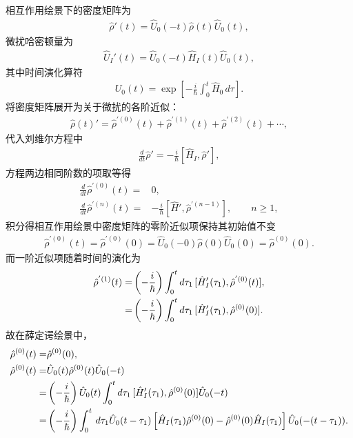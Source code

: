\documentclass[a4paper, 10pt]{article}
\begin{document}
\begin{multicols}{2}
相互作用绘景下的密度矩阵为
\begin{align}
    \hat{\rho}'(t)=\hat{U}_0(-t)\hat{\rho}(t)\hat{U}_0(t),
\end{align}
微扰哈密顿量为
\begin{align}
    \hat{U}_I'(t)=\hat{U}_0(-t)\hat{H}_I(t)\hat{U}_0(t),
\end{align}
其中时间演化算符
\begin{align}
    U_0(t)=\exp\left[-\frac{i}{\hbar}\int_0^t\hat{H}_0\,d\tau\right].
\end{align}
将密度矩阵展开为关于微扰的各阶近似：
\begin{align}
    \hat{\rho}(t)'=\hat{\rho}^{'(0)}(t)+\hat{\rho}^{'(1)}(t)+\hat{\rho}^{'(2)}(t)+\cdots,
\end{align}
代入刘维尔方程中
\begin{align}
    \frac{d}{dt}\hat{\rho}'=-\frac{i}{\hbar}[\hat{H}_I,\hat{\rho}'],
\end{align}
方程两边相同阶数的项取等得
\begin{align}
    \frac{d}{dt}\hat{\rho}^{'(0)}(t)=&0,\\
    \frac{d}{dt}\hat{\rho}^{'(n)}(t)=&-\frac{i}{\hbar}\left[\hat{H}',\hat{\rho}^{'(n-1)}\right],\qquad n\geq 1,
\end{align}
积分得相互作用绘景中密度矩阵的零阶近似项保持其初始值不变
\begin{align}
    \hat{\rho}^{'(0)}(t)=\hat{\rho}^{'(0)}(0)=\hat{U}_0(-0)\hat{\rho}(0)\hat{U}_0(0)=\hat{\rho}^{(0)}(0).
\end{align}
而一阶近似项随着时间的演化为
\begin{align}
    \notag\hat{\rho}^{'(1)}(t)=&\left(-\frac{i}{\hbar}\right)\int_0^td\tau_1\,[\hat{H}_I'(\tau_1),\hat{\rho}^{'(0)}(t)],\\
    =&\left(-\frac{i}{\hbar}\right)\int_0^td\tau_1\,[\hat{H}_I'(\tau_1),\hat{\rho}^{(0)}(0)].
\end{align}
故在薛定谔绘景中，
\tiny
\begin{align}
    \hat{\rho}^{(0)}(t)=&\hat{\rho}^{(0)}(0),\\
    \notag\hat{\rho}^{(0)}(t)=&\hat{U}_0(t)\hat{\rho}^{(0)}(t)\hat{U}_0(-t)\\
    \notag=&\left(-\frac{i}{\hbar}\right)\hat{U}_0(t)\int_0^td\tau_1\,[\hat{H}_I'(\tau_1),\hat{\rho}^{(0)}(0)]\hat{U}_0(-t)\\
    =&\left(-\frac{i}{\hbar}\right)\int_0^t\,d\tau_1\hat{U}_0(t-\tau_1)\left[\hat{H}_I(\tau_1)\hat{\rho}^{(0)}(0)-\hat{\rho}^{(0)}(0)\hat{H}_I(\tau_1)\right]\hat{U}_0(-(t-\tau_1)).

\end{align}
\end{multicols}
\end{document}
